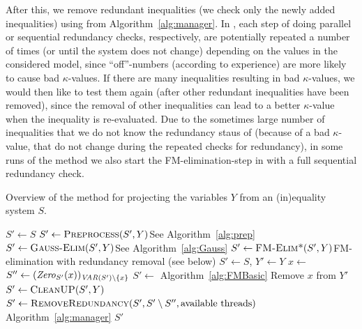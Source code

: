 After this, we remove redundant inequalities (we check only the newly added inequalities) using  from Algorithm~\ref{alg:manager}. 
In , each step of doing parallel or sequential redundancy checks, respectively, are potentially repeated a number of times (or until the system does not change) depending on the values in the considered model, since ``off''-numbers (according to experience) are more likely to cause bad $\kappa$-values. If there are many inequalities resulting in bad $\kappa$-values, we would then like to test them again (after other redundant inequalities have been removed), since the removal of other inequalities can lead to a better $\kappa$-value when the inequality is re-evaluated.    
Due to the sometimes large number of inequalities that we do not know the redundancy staus of (because of a bad $\kappa$-value, that do not change during the repeated checks for redundancy), in some runs of the method we also start the FM-elimination-step in  with a full sequential redundancy check.

\begin{algorithm}\caption{Overview of the method for projecting the variables $Y$ from an (in)equality system  $S$.}\label{alg:project}
\begin{algorithmic}[1]
	\State $S'\gets S$
	\State $S'\gets\Call{Preprocess}{S',Y}$\Comment See Algorithm~\ref{alg:prep}
	\State $S'\gets\Call{Gauss-Elim}{S',Y}$\Comment See Algorithm~\ref{alg:Gauss} 
	\State $S'\gets \Call{FM-Elim*}{S',Y}$\Comment FM-elimination with redundancy removal (see below)
\EndFunction
\State
{}
	\State  $S'\gets S$, $Y'\gets Y$
		\State $x\gets$ 
		\State $S''\gets(\mathit{Zero}_{S'}(x))_{\mathit{VAR}(S')\setminus\{x\}}$
		\State $S' \gets$  \Comment Algorithm~\ref{alg:FMBasic}
		\State Remove $x$ from $Y'$
		\State $S'\gets\Call{CleanUP}{S',Y}$
		\State $S'\gets \Call{RemoveRedundancy}{S', S'\setminus S'', \text{available threads}}$ 	\Comment Algorithm~\ref{alg:manager}\label{ln:projx}
	\EndWhile
	\State \Return $S'$
\EndFunction
\end{algorithmic}
\end{algorithm}
%
